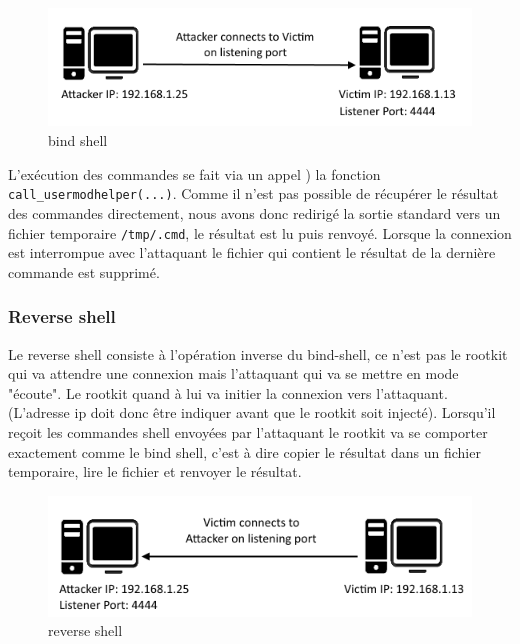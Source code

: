 \documentclass[12pt]{article}
\begin{document}
\begin{figure}[H] 
\begin{center}
\includegraphics{./img/bind-shell.png}

\caption[dsfsdf]{bind shell}
\end{center}
\end{figure}
            
            L'exécution des commandes se fait via un appel ) la fonction \texttt{ call\_usermodhelper(...)}. Comme il n'est pas possible de récupérer le résultat des commandes directement, nous avons donc redirigé la sortie standard vers un fichier temporaire \texttt{/tmp/.cmd}, le résultat est lu puis renvoyé. Lorsque la connexion est interrompue avec l'attaquant le fichier qui contient le résultat de la dernière commande est supprimé.
            
        \subsubsection{Reverse shell}
            
            Le reverse shell consiste à l'opération inverse du bind-shell, ce n'est pas le rootkit qui va attendre une connexion mais l'attaquant qui va se mettre en mode "écoute". Le rootkit quand à lui va initier la connexion vers l'attaquant. (L'adresse ip doit donc être indiquer avant que le rootkit soit injecté). Lorsqu'il reçoit les commandes shell envoyées par l'attaquant le rootkit va se comporter exactement comme le bind shell, c'est à dire copier le résultat dans un fichier temporaire, lire le fichier et renvoyer le résultat.
            
\begin{figure}[H] 
\begin{center}
\includegraphics{./img/reverse-shell.png}

\caption[dsfsdf]{reverse shell}
\end{center}
\end{figure}
            
\end{document}
